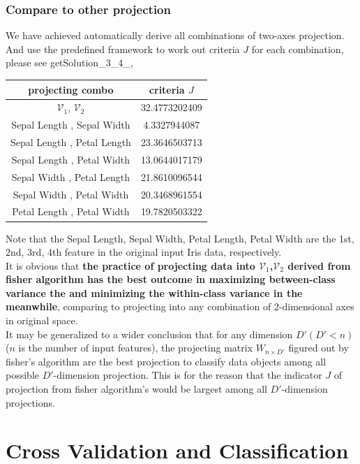 \documentclass[11pt,a4paper]{article}
\newcommand{\htab}{\hspace*{0.63cm}}
\newcommand{\V}{\mathcal{V}}
\begin{document}
\subsubsection{Compare to other projection}
\htab We have achieved automatically derive all combinations of two-axes projection. And use the predefined framework to work out criteria $J$ for each combination, please see getSolution\_3\_4\_, \\ 
\begin{center}
\begin{tabular} {|| c | c ||}
    \hline 
    projecting combo & criteria $J$ \\ \hline 
    $\V_{1}$, $\V_{2}$ & 32.4773202409 \\ \hline 
    Sepal Length ,  Sepal Width  & 4.3327944087 \\ \hline 
    Sepal Length ,  Petal Length  & 23.3646503713 \\ \hline 
    Sepal Length ,  Petal Width  & 13.0644017179 \\ \hline 
    Sepal Width ,  Petal Length  & 21.8610096544 \\ \hline 
    Sepal Width ,  Petal Width  & 20.3468961554 \\ \hline 
    Petal Length ,  Petal Width  & 19.7820503322 \\ \hline 
\end{tabular}
\end{center}
\htab Note that the Sepal Length,  Sepal Width, Petal Length, Petal Width are the 1st, 2nd, 3rd, 4th feature in the original input Iris data, respectively. \\
\htab It is obvious that \textbf{ the practice of projecting data into $\V_{1}$,$\V_{2}$ derived from fisher algorithm has the best outcome in maximizing between-class variance the and minimizing the within-class variance in the meanwhile}, comparing to projecting into any combination of 2-dimensional axes in original space. \\
\htab It may be generalized to a wider conclusion that for any dimension $D' (D'< n)$ ($n$ is the number of input features),  the projecting matrix $W_{n\times D'}$ figured out by fisher's algorithm are the best projection to classify data objects among all possible $D'$-dimension projection. This is for the reason that the indicator $J$ of projection from fisher algorithm's would be largest among all $D'$-dimension projections.
\newpage

\section{Cross Validation and Classification}
\end{document}
